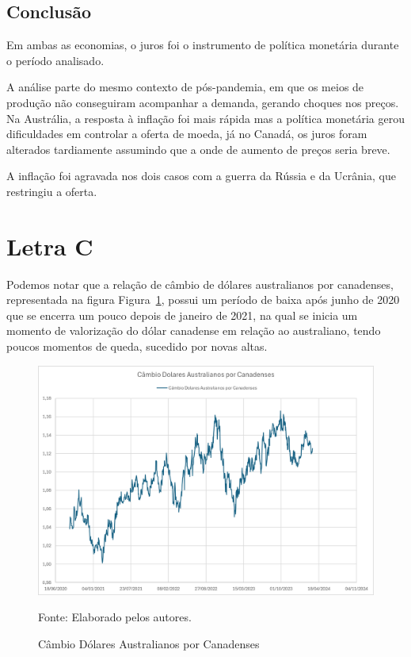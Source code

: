 \documentclass[a4paper,12pt]{article}[abntex2]
\begin{document}
\subsection{\textbf{Conclusão}}

Em ambas as economias, o juros foi o instrumento de política monetária durante o período analisado.

A análise parte do mesmo contexto de pós-pandemia, em que os meios de produção não conseguiram acompanhar a demanda, gerando choques nos preços.
Na Austrália, a resposta à inflação foi mais rápida mas a política monetária gerou dificuldades em controlar a oferta de moeda, já no Canadá, os juros foram alterados tardiamente assumindo que a onde de aumento de preços seria breve.

A inflação foi agravada nos dois casos com a guerra da Rússia e da Ucrânia, que restringiu a oferta.

\section{\textbf{Letra C}}
Podemos notar que a relação de câmbio de dólares australianos por canadenses, representada na figura Figura~\ref{fig:Câmbio Dólares Australianos por Canadenses}, possui um período de baixa após junho de 2020 que se encerra um pouco depois de janeiro de 2021, na qual se inicia um momento de valorização do dólar canadense em relação ao australiano, tendo poucos momentos de queda, sucedido por novas altas.

\begin{figure}[H]
    \centering
    \caption{Câmbio Dólares Australianos por Canadenses} 
    \includegraphics[width=1.0\textwidth]{Câmbio Dólares Australianos por Canadenses.png}
    \label{fig:Câmbio Dólares Australianos por Canadenses}
    
    \footnotesize{Fonte: Elaborado pelos autores.}
    \end{figure}
\end{document}

